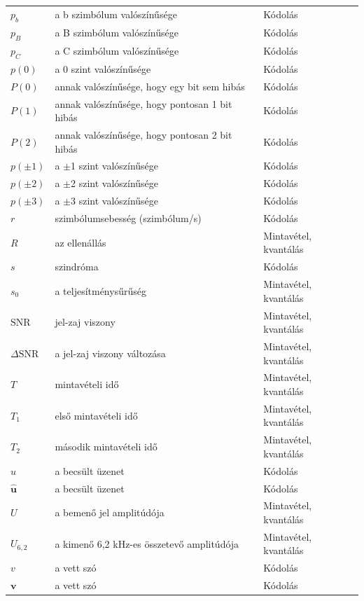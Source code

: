 {\begin{longtable}{@{}>{\raggedright\arraybackslash}p{2.4cm}>{\raggedright\arraybackslash}p{8.2cm}>{\raggedright\arraybackslash}p{3.8cm}@{}}
$p_b$ & a b szimbólum valószínűsége & Kódolás\\
$p_B$ & a B szimbólum valószínűsége & Kódolás\\
$p_C$ & a C szimbólum valószínűsége & Kódolás\\
$p(0)$ & a 0 szint valószínűsége & Kódolás\\
$P(0)$ & annak valószínűsége, hogy egy bit sem hibás & Kódolás\\
$P(1)$ & annak valószínűsége, hogy pontosan 1 bit hibás & Kódolás\\
$P(2)$ & annak valószínűsége, hogy pontosan 2 bit hibás & Kódolás\\
$p(\pm1)$ & a $\pm$1 szint valószínűsége & Kódolás\\
$p(\pm2)$ & a $\pm$2 szint valószínűsége & Kódolás\\
$p(\pm3)$ & a $\pm$3 szint valószínűsége & Kódolás\\
$r$ & szimbólumsebesség (szimbólum/s) & Kódolás\\
$R$ & az ellenállás & Mintavétel, kvantálás\\
$s$ & szindróma & Kódolás\\
$s_0$ & a teljesítménysűrűség & Mintavétel, kvantálás\\
$\text{SNR}$ & jel-zaj viszony & Mintavétel, kvantálás\\
$\Delta\text{SNR}$ & a jel-zaj viszony változása & Mintavétel, kvantálás\\
$T$ & mintavételi idő & Mintavétel, kvantálás\\
$T_1$ & első mintavételi idő & Mintavétel, kvantálás\\
$T_2$ & második mintavételi idő & Mintavétel, kvantálás\\
$\hat u$ & a becsült üzenet & Kódolás\\
$\hat{\mathbf u}$ & a becsült üzenet & Kódolás\\
$U$ & a bemenő jel amplitúdója & Mintavétel, kvantálás\\
$U_{6{,}2}$ & a kimenő 6,2 kHz-es összetevő amplitúdója & Mintavétel, kvantálás\\
$v$ & a vett szó & Kódolás\\
$\mathbf v$ & a vett szó & Kódolás\\
\bottomrule\end{longtable}}



